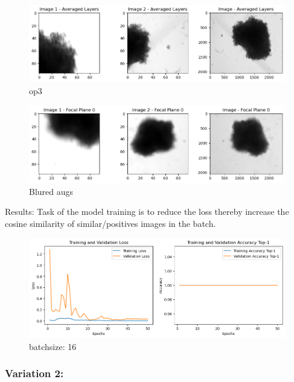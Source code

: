 \documentclass[a4paper,12pt]{report}
\begin{document}
  \begin{figure}[H]
    \centering
    \includegraphics[width=0.9\linewidth]{figures/output3.png} %
    \caption{op3}
    \label{fig:output3}
  \end{figure}

  \begin{figure}[H]
    \centering
    \includegraphics[width=0.9\linewidth]{figures/op4.png} %
    \caption{Blured augs}
    \label{fig:output4}
  \end{figure}

Results:
Task of the model training is to reduce the loss thereby increase the cosine similarity of similar/positives images in the batch.
\begin{figure}[H]
  \centering
  \includegraphics[width=0.9\linewidth]{figures/image.png} %
  \caption{batchsize: 16}
  \label{fig:batch 16}
\end{figure}
\subsubsection{Variation 2:}
\end{document}
